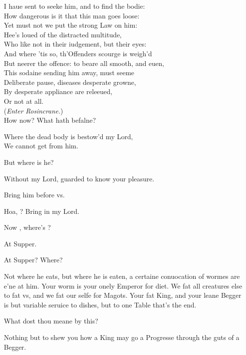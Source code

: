 \documentclass[a5paper,DIV=calc,11pt]{scrbook}
\begin{document}
\begin{drama*}
    \kingspeaks I haue sent to seeke him, and to find the bodie:\\
    How dangerous is it that this man goes loose:\\
    Yet must not we put the strong Law on him:\\
    Hee's loued of the distracted multitude,\\
    Who like not in their iudgement, but their eyes:\\
    And where 'tis so, th'Offenders scourge is weigh'd\\
    But neerer the offence: to beare all smooth, and euen,\\
    This sodaine sending him away, must seeme\\
    Deliberate pause, diseases desperate growne,\\
    By desperate appliance are releeued,\\
    Or not at all.\\
    (\textit{Enter Rosincrane.})\\
    How now? What hath befalne?
    
    \rosinspeaks Where the dead body is bestow'd my Lord,\\
    We cannot get from him.
    
    \kingspeaks But where is he?
    
    \rosinspeaks Without my Lord, guarded to know your pleasure.
    
    \kingspeaks Bring him before vs.
    
    \rosinspeaks Hoa, \guil? Bring in my Lord.
    
    
    \kingspeaks Now \ham, where's \pol?
    
    \hamspeaks At Supper.
    
    \kingspeaks At Supper? Where?
    
    \hamspeaks Not where he eats, but where he is eaten, a certaine conuocation of wormes are e'ne at him. Your worm is your onely Emperor for diet. We fat all creatures else to fat vs, and we fat our selfe for Magots. Your fat King, and your leane Begger is but variable seruice to dishes, but to one Table that's the end.
    
    \kingspeaks What dost thou meane by this?
    
    \hamspeaks Nothing but to shew you how a King may go a Progresse through the guts of a Begger.
    

\end{drama*}
\end{document}
